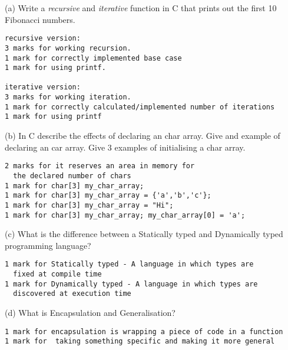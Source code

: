 \documentclass{exam}
\begin{document}
\begin{question}
\begin{roster}
\item[(a)]
Write a {\em recursive} and {\em iterative} function in C that prints out the first 10 Fibonacci numbers. 
\color{red}
\begin{lstlisting}
recursive version: 
3 marks for working recursion. 
1 mark for correctly implemented base case
1 mark for using printf. 

iterative version: 
3 marks for working iteration. 
1 mark for correctly calculated/implemented number of iterations
1 mark for using printf
\end{lstlisting}
\color{black}

\item[(b)]
In C describe the effects of declaring an char array.  Give and example of declaring an car array.  Give 3 examples of initialising a char array.
\color{red}
\begin{lstlisting}
2 marks for it reserves an area in memory for 
  the declared number of chars
1 mark for char[3] my_char_array;
1 mark for char[3] my_char_array = {'a','b','c'};
1 mark for char[3] my_char_array = "Hi";
1 mark for char[3] my_char_array; my_char_array[0] = 'a';
\end{lstlisting}
\color{black}

\item[(c)]
What is the difference between a Statically typed and Dynamically typed programming language?
\color{red}
\begin{lstlisting}
1 mark for Statically typed - A language in which types are 
  fixed at compile time
1 mark for Dynamically typed - A language in which types are 
  discovered at execution time
\end{lstlisting}
\color{black}

\item[(d)]
What is Encapsulation and Generalisation?
\color{red}
\begin{lstlisting}
1 mark for encapsulation is wrapping a piece of code in a function
1 mark for  taking something specific and making it more general
\end{lstlisting}
\color{black}

\end{roster}
\end{question}

\clearpage
\end{document}
